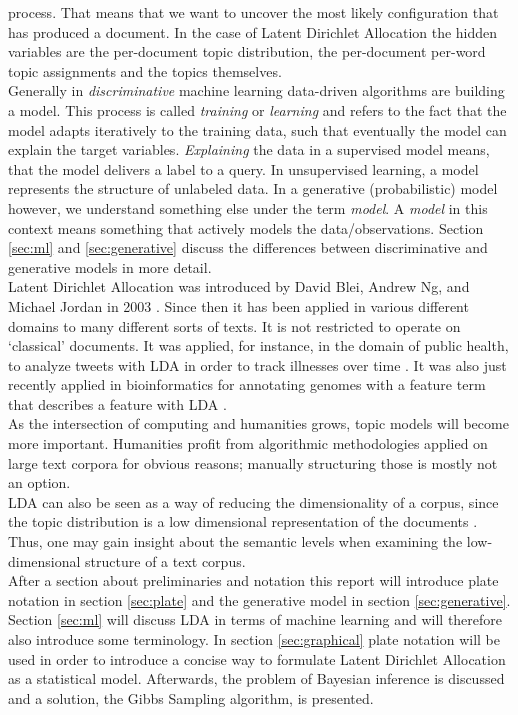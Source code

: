 \documentclass[a4paper,ngerman, english]{atseminar}
\begin{document}
process. That means that we want to uncover the most likely configuration that has produced a document.
In the case of Latent Dirichlet Allocation the hidden variables are the
per-document topic distribution, the per-document per-word topic assignments and
the topics themselves. \\
Generally in \textit{discriminative} machine learning data-driven algorithms are building a model. 
This process is called \textit{training} or \textit{learning} and refers to the fact that the model adapts iteratively 
to the training data, such that eventually the model can explain the target variables. \textit{Explaining} the 
data in a supervised model means, that the model delivers a label to a query. In unsupervised learning, 
a model represents the structure of unlabeled data.
In a generative (probabilistic) model however, we understand something else under the term \textit{model}.
A \textit{model} in this context means something that actively models the data/observations. 
Section \ref{sec:ml} and \ref{sec:generative} discuss the differences between discriminative and generative models in more detail. \\
Latent Dirichlet Allocation was introduced by David Blei, Andrew Ng, and Michael Jordan in 2003 \cite{blei2003latent}.
Since then it has been applied in various different domains to many different sorts of texts. 
It is not restricted to operate on `classical' documents. It was applied, for instance, in the domain of public health, to
analyze tweets with LDA in order to track illnesses over time \cite{paul2011you}. It was also 
just recently applied in bioinformatics for annotating genomes with a feature term 
that describes a feature with LDA \cite{pinoli2014latent} .
\\
As the intersection of computing and humanities grows, topic models will become more important.
Humanities profit from algorithmic methodologies applied on large text corpora for obvious reasons;
manually structuring those is mostly not an option.\\
LDA can also be seen as a way of reducing the dimensionality of a corpus, since the topic distribution is 
a low dimensional representation of the documents \cite{masada2008comparing}.
Thus, one may gain insight about the semantic levels when examining the low-dimensional structure of a text corpus.
\\
After a section about preliminaries and notation this report will introduce plate notation in section \ref{sec:plate}
and the generative model in section \ref{sec:generative}. Section \ref{sec:ml} will discuss LDA in terms of machine learning 
and will therefore also introduce some terminology. In section \ref{sec:graphical} plate notation will be used in order to 
introduce a concise way to formulate Latent Dirichlet Allocation as a statistical model.
Afterwards, the problem of Bayesian inference is discussed and a solution, the Gibbs Sampling algorithm, is presented.
\end{document}
